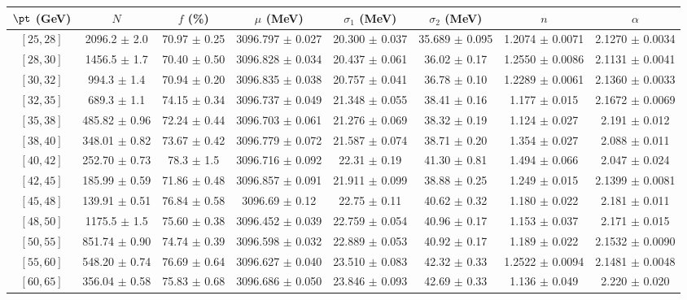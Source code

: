 \begin{tabular}{c||c|c|c|c|c|c|c}
$\pt$ (GeV) & $N$ & $f$ (\%) & $\mu$ (MeV) & $\sigma_1$ (MeV) & $\sigma_2$ (MeV) & $n$ & $\alpha$ \\
\hline
$[25, 28]$ & 2096.2 $\pm$ 2.0 & 70.97 $\pm$ 0.25 & 3096.797 $\pm$ 0.027 & 20.300 $\pm$ 0.037 & 35.689 $\pm$ 0.095 & 1.2074 $\pm$ 0.0071 & 2.1270 $\pm$ 0.0034\\
$[28, 30]$ & 1456.5 $\pm$ 1.7 & 70.40 $\pm$ 0.50 & 3096.828 $\pm$ 0.034 & 20.437 $\pm$ 0.061 & 36.02 $\pm$ 0.17 & 1.2550 $\pm$ 0.0086 & 2.1131 $\pm$ 0.0041\\
$[30, 32]$ & 994.3 $\pm$ 1.4 & 70.94 $\pm$ 0.20 & 3096.835 $\pm$ 0.038 & 20.757 $\pm$ 0.041 & 36.78 $\pm$ 0.10 & 1.2289 $\pm$ 0.0061 & 2.1360 $\pm$ 0.0033\\
$[32, 35]$ & 689.3 $\pm$ 1.1 & 74.15 $\pm$ 0.34 & 3096.737 $\pm$ 0.049 & 21.348 $\pm$ 0.055 & 38.41 $\pm$ 0.16 & 1.177 $\pm$ 0.015 & 2.1672 $\pm$ 0.0069\\
$[35, 38]$ & 485.82 $\pm$ 0.96 & 72.24 $\pm$ 0.44 & 3096.703 $\pm$ 0.061 & 21.276 $\pm$ 0.069 & 38.32 $\pm$ 0.19 & 1.124 $\pm$ 0.027 & 2.191 $\pm$ 0.012\\
$[38, 40]$ & 348.01 $\pm$ 0.82 & 73.67 $\pm$ 0.42 & 3096.779 $\pm$ 0.072 & 21.587 $\pm$ 0.074 & 38.71 $\pm$ 0.20 & 1.354 $\pm$ 0.027 & 2.088 $\pm$ 0.011\\
$[40, 42]$ & 252.70 $\pm$ 0.73 & 78.3 $\pm$ 1.5 & 3096.716 $\pm$ 0.092 & 22.31 $\pm$ 0.19 & 41.30 $\pm$ 0.81 & 1.494 $\pm$ 0.066 & 2.047 $\pm$ 0.024\\
$[42, 45]$ & 185.99 $\pm$ 0.59 & 71.86 $\pm$ 0.48 & 3096.857 $\pm$ 0.091 & 21.911 $\pm$ 0.099 & 38.88 $\pm$ 0.25 & 1.249 $\pm$ 0.015 & 2.1399 $\pm$ 0.0081\\
$[45, 48]$ & 139.91 $\pm$ 0.51 & 76.84 $\pm$ 0.58 & 3096.69 $\pm$ 0.12 & 22.75 $\pm$ 0.11 & 40.62 $\pm$ 0.32 & 1.180 $\pm$ 0.022 & 2.181 $\pm$ 0.011\\
$[48, 50]$ & 1175.5 $\pm$ 1.5 & 75.60 $\pm$ 0.38 & 3096.452 $\pm$ 0.039 & 22.759 $\pm$ 0.054 & 40.96 $\pm$ 0.17 & 1.153 $\pm$ 0.037 & 2.171 $\pm$ 0.015\\
$[50, 55]$ & 851.74 $\pm$ 0.90 & 74.74 $\pm$ 0.39 & 3096.598 $\pm$ 0.032 & 22.889 $\pm$ 0.053 & 40.92 $\pm$ 0.17 & 1.189 $\pm$ 0.022 & 2.1532 $\pm$ 0.0090\\
$[55, 60]$ & 548.20 $\pm$ 0.74 & 76.69 $\pm$ 0.64 & 3096.627 $\pm$ 0.040 & 23.510 $\pm$ 0.083 & 42.32 $\pm$ 0.33 & 1.2522 $\pm$ 0.0094 & 2.1481 $\pm$ 0.0048\\
$[60, 65]$ & 356.04 $\pm$ 0.58 & 75.83 $\pm$ 0.68 & 3096.686 $\pm$ 0.050 & 23.846 $\pm$ 0.093 & 42.69 $\pm$ 0.33 & 1.136 $\pm$ 0.049 & 2.220 $\pm$ 0.020\\

\end{tabular}
